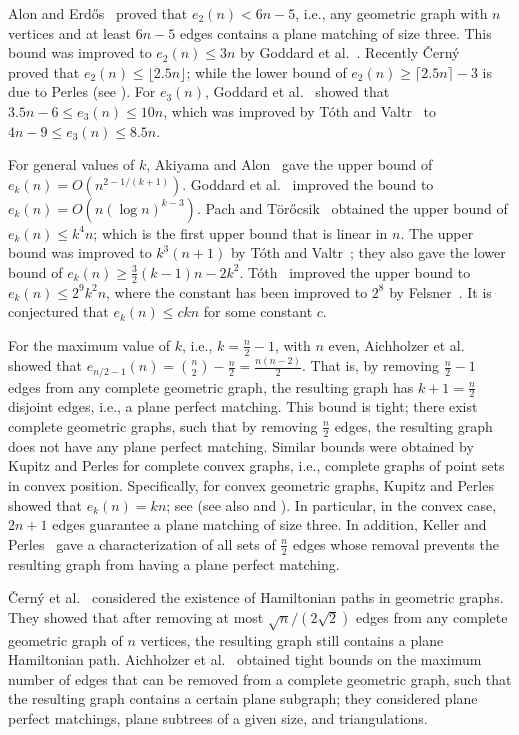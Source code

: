 \documentclass[11pt,a4paper]{article}
\newcommand{\e}[2]{e_{#1}{(#2)}}
\begin{document}
Alon and Erd\H{o}s~\cite{Alon1989} proved that $\e{2}{n}<6n-5$, i.e., any geometric graph with $n$ vertices and at least $6n-5$ edges contains a plane matching of size three. This bound was improved to $\e{2}{n}\le 3n$ by Goddard et al.~\cite{Goddard1996}. Recently {\v{C}}ern{\'{y}}~\cite{Cerny2005} proved that $\e{2}{n}\le \lfloor 2.5 n\rfloor$; while the lower bound of $\e{2}{n}\ge \lceil2.5n\rceil-3$ is due to Perles (see \cite{Cerny2005}). For $\e{3}{n}$, Goddard et al.~\cite{Goddard1996} showed that $3.5n-6\le\e{3}{n}\le 10n$, which was improved by T{\'{o}}th and Valtr~\cite{Toth1999} to $4n-9\le\e{3}{n}\le 8.5n$.

For general values of $k$, Akiyama and Alon~\cite{Akiyama1989} gave the upper bound of $\e{k}{n}=O(n^{2-1/(k+1)})$. Goddard et al.~\cite{Goddard1996} improved the bound to $\e{k}{n}=O(n(\log n)^{k-3})$. Pach and T{\"{o}}r{\H{o}}csik~\cite{Pach1994} obtained the upper bound of $\e{k}{n} \le k^4n$; which is the first upper bound that is linear in $n$. The upper bound was improved to $k^3(n+1)$ by T{\'{o}}th and Valtr~\cite{Toth1999}; they also gave the lower bound of $\e{k}{n}\ge \frac{3}{2}(k-1)n-2k^2$. T{\'{o}}th~\cite{Toth2000} improved the upper bound to $\e{k}{n}\le 2^9k^2n$, where the constant has been improved to $2^8$ by Felsner~\cite{Felsner2004}. It is conjectured that $\e{k}{n}\le ckn$ for some constant $c$.

For the maximum value of $k$, i.e., $k=\frac{n}{2}-1$, with $n$ even, Aichholzer et al.~\cite{Aichholzer2010} showed that $\e{n/2-1}{n}={n \choose 2}-\frac{n}{2}=\frac{n(n-2)}{2}$. That is, by removing $\frac{n}{2}-1$ edges from any complete geometric graph, the resulting graph has $k+1=\frac{n}{2}$ disjoint edges, i.e., a plane perfect matching. This bound is tight; there exist complete geometric graphs, such that by removing $\frac{n}{2}$ edges, the resulting graph does not have any plane perfect matching. Similar bounds were obtained by Kupitz and Perles for complete convex graphs, i.e., complete graphs of point sets in convex position. 
Specifically, for convex geometric graphs, Kupitz and Perles showed that $\e{k}{n}=kn$; see \cite{Goddard1996} (see also \cite{Akiyama1989} and \cite{Alon1989}). In particular, in the convex case, $2n + 1$ edges guarantee a plane matching of size three. In addition, Keller and Perles~\cite{Keller2012} gave a characterization of all sets of $\frac{n}{2}$ edges whose removal prevents the resulting graph from having a plane perfect matching.

\v{C}ern{\'{y}} et al.~\cite{Cerny2007} considered the existence of Hamiltonian paths in geometric graphs. They showed that after removing at most $\sqrt{n}/(2\sqrt{2})$ edges from any complete geometric graph of $n$ vertices, the resulting graph still contains a plane Hamiltonian path. Aichholzer et al.~\cite{Aichholzer2010} obtained tight bounds on the maximum number of edges that can be removed from a complete geometric graph, such that the resulting graph contains a certain plane subgraph; they considered plane perfect matchings, plane subtrees of a given size, and triangulations. 
\end{document}
